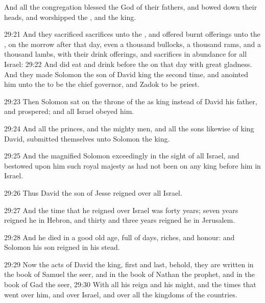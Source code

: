 And all the congregation blessed the \LORD God of their fathers, and bowed down their heads, and worshipped the \LORD, and the king.

29:21 And they sacrificed sacrifices unto the \LORD, and offered burnt offerings unto the \LORD, on the morrow after that day, even a thousand bullocks, a thousand rams, and a thousand lambs, with their drink offerings, and sacrifices in abundance for all Israel: 29:22 And did eat and drink before the \LORD on that day with great gladness. And they made Solomon the son of David king the second time, and anointed him unto the \LORD to be the chief governor, and Zadok to be priest.

29:23 Then Solomon sat on the throne of the \LORD as king instead of David his father, and prospered; and all Israel obeyed him.

29:24 And all the princes, and the mighty men, and all the sons likewise of king David, submitted themselves unto Solomon the king.

29:25 And the \LORD magnified Solomon exceedingly in the sight of all Israel, and bestowed upon him such royal majesty as had not been on any king before him in Israel.

29:26 Thus David the son of Jesse reigned over all Israel.

29:27 And the time that he reigned over Israel was forty years; seven years reigned he in Hebron, and thirty and three years reigned he in Jerusalem.

29:28 And he died in a good old age, full of days, riches, and honour: and Solomon his son reigned in his stead.

29:29 Now the acts of David the king, first and last, behold, they are written in the book of Samuel the seer, and in the book of Nathan the prophet, and in the book of Gad the seer, 29:30 With all his reign and his might, and the times that went over him, and over Israel, and over all the kingdoms of the countries.

